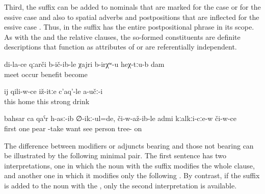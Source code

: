 Third, the suffix can be added to nominals that are marked for the  case  or for the essive case  and also to spatial adverbs and postpositions that are inflected for the essive case . Thus, in  the suffix has the entire postpositional phrase in its scope. As with the  and the relative clauses, the so-formed constituents are definite descriptions that function as attributes of  or are referentially independent.

\begin{exe}
	\ex	\label{ex:‎‎‎It happens to me that I come across my (milk) there minor}
	\gll	di-la-ce	qːarči	b-ič-ib-le	χajri	b-irχʷ-u	heχ-tːu-b	dam\\
			meet	occur	benefit	become			\\
	\glt	{}

	\ex	\label{ex:‎The other one (son) who was at home did not drink that much minor}
	\gll	ij	qili-w-ce	iž-itːe	c'aq'-le	a-učː-i\\
		this	home	this\tsc{-advz}	strong	drink\\
	\glt	{}

	\ex	\label{ex:‎‎‎First he wanted to take one pear, when he saw the man who was on the tree minor}
	\gll	bahsar	ca	qaˁr	h-asː-ib	∅-ikː-ul=de,	či-w-až-ib-le	admi	kːalkːi-cːe-w	či-w-ce\\
		first	one	pear	-take	want	see	person	tree-	on\\
	\glt	{}
\end{exe}

The difference between modifiers or adjuncts bearing  and those not bearing  can be illustrated by the following minimal pair. The first sentence has two interpretations, one in which the noun with the  suffix modifies the whole clause, and another one in which it modifies only the following . By contrast, if the suffix  is added to the noun with the , only the second interpretation is available.

